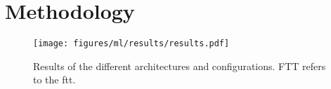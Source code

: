 \chapter{Methodology}
\label{ch:Methodology}







\begin{figure}
    \centering
    \texttt{[image: figures/ml/results/results.pdf]}
    \caption{Results of the different architectures and configurations. FTT refers to the \gls{ftt}.}
    \label{tab:results}
\end{figure}






